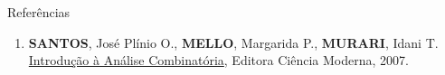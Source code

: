 \begin{frame}[fragile]{Referências}

    \begin{enumerate}
        \item \textbf{SANTOS}, José Plínio O., \textbf{MELLO}, Margarida P., \textbf{MURARI}, Idani T. \href{http://www.vestseller.com.br/matematica/introduc-o-a-analise-combinatoria-jose-plinio-margarida-mello-idani-murari}{Introdução à Análise Combinatória}, Editora Ciência Moderna, 2007.
    \end{enumerate}

\end{frame}
